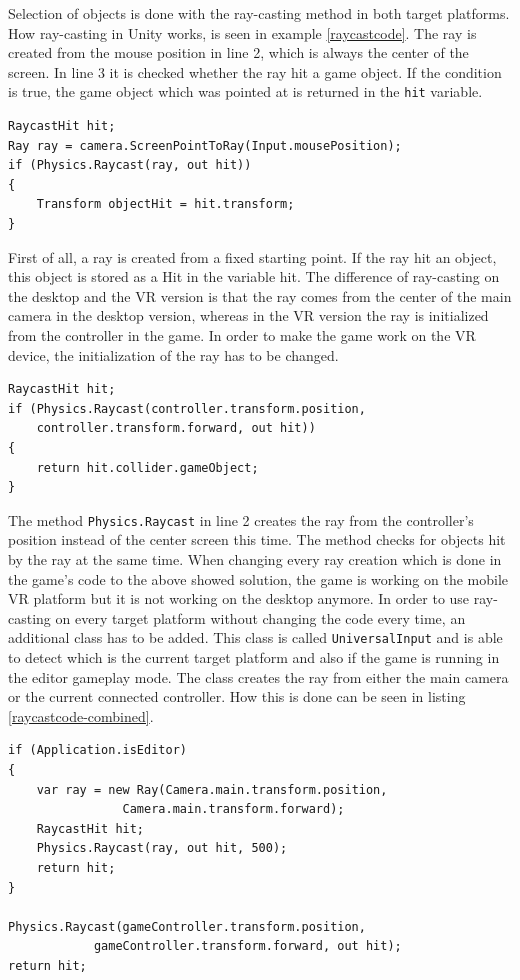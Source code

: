 \newpage
Selection of objects is done with the ray-casting method in both target platforms. How ray-casting in Unity works, is seen in example \ref{raycastcode}. The ray is created from the mouse position in line 2, which is always the center of the screen. In line 3 it is checked whether the ray hit a game object. If the condition is true, the game object which was pointed at is returned in the \texttt{hit} variable.
\begin{lstlisting} 
RaycastHit hit;
Ray ray = camera.ScreenPointToRay(Input.mousePosition);
if (Physics.Raycast(ray, out hit))
{
    Transform objectHit = hit.transform;
}
\end{lstlisting}
\label{raycastcode}
\vspace{1cm}
First of all, a ray is created from a fixed starting point. If the ray hit an object, this object is stored as a Hit in the variable hit. The difference of ray-casting on the desktop and the VR version is that the ray comes from the center of the main camera in the desktop version, whereas in the VR version the ray is initialized from the controller in the game. In order to make the game work on the VR device, the initialization of the ray has to be changed.
\begin{lstlisting} 
RaycastHit hit;
if (Physics.Raycast(controller.transform.position,
    controller.transform.forward, out hit))
{
    return hit.collider.gameObject;
}
\end{lstlisting}
\label{raycastcode-new}
\vspace{1cm}
The method \texttt{Physics.Raycast} in line 2 creates the ray from the controller's position instead of the center screen this time. The method checks for objects hit by the ray at the same time.
When changing every ray creation which is done in the game's code to the above showed solution, the game is working on the mobile VR platform but it is not working on the desktop anymore. In order to use ray-casting on every target platform without changing the code every time, an additional class has to be added. This class is called \texttt{UniversalInput} and is able to detect which is the current target platform and also if the game is running in the editor gameplay mode. The class creates the ray from either the main camera or the current connected controller. How this is done can be seen in listing \ref{raycastcode-combined}.
\begin{lstlisting} 
if (Application.isEditor)
{
    var ray = new Ray(Camera.main.transform.position, 
                Camera.main.transform.forward);
    RaycastHit hit;
    Physics.Raycast(ray, out hit, 500);
    return hit;
}
  
Physics.Raycast(gameController.transform.position, 
            gameController.transform.forward, out hit);
return hit;
\end{lstlisting}
